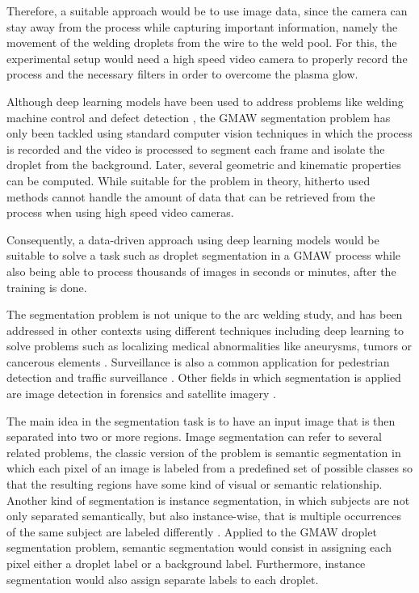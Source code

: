 \begin{intro}
Therefore, a suitable approach would be to use image data, since the camera can stay away from the process while capturing important information, namely the movement of the welding droplets from the wire to the weld pool. For this, the experimental setup would need a high speed video camera to properly record the process and the necessary filters in order to overcome the plasma glow. 

Although deep learning models have been used to address problems like welding machine control and defect detection \cite{Gunther, Zhang}, the GMAW segmentation problem has only been tackled using standard computer vision techniques \cite{Ray, Zhai} in which the process is recorded and the video is processed to segment each frame and isolate the droplet from the background. Later, several geometric and kinematic properties can be computed. While suitable for the problem in theory, hitherto used methods cannot handle the amount of data that can be retrieved from the process when using high speed video cameras. 

Consequently, a data-driven approach using deep learning models would be suitable to solve a task such as droplet segmentation in a GMAW process while also being able to process thousands of images in seconds or minutes, after the training is done.

The segmentation problem is not unique to the arc welding study, and has been addressed in other contexts using different techniques including deep learning to solve problems such as localizing medical abnormalities \cite{medical-image-survey} like aneurysms, tumors or cancerous elements \cite{aneurysm, tumor, cancer}. Surveillance is also a common application for pedestrian detection and traffic surveillance \cite{pedestrians, traffic}. Other fields in which segmentation is applied are image detection in forensics \cite{forensics1, forensics2, forensics3} and satellite imagery \cite{satellite}.

The main idea in the segmentation task is to have an input image that is then separated into two or more regions. Image segmentation can refer to several related problems, the classic version of the problem is semantic segmentation in which each pixel of an image is labeled from a predefined set of possible classes so that the resulting regions have some kind of visual or semantic relationship. Another kind of segmentation is instance segmentation, in which subjects are not only separated semantically, but also instance-wise, that is multiple occurrences of the same subject are labeled differently \cite{segmentation-survey}. Applied to the GMAW droplet segmentation problem, semantic segmentation would consist in assigning each pixel either a droplet label or a background label. Furthermore, instance segmentation would also assign separate labels to each droplet.


\end{intro}
